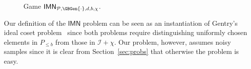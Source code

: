 \documentclass[draft]{llncs}
\newcommand{\I}{\ensuremath{\mathcal{I}}\xspace}
\newcommand{\IMN}{\ensuremath{\mathsf{IMN}}\xspace}
\newcommand{\Finalize}{\mathbf{Finalize}}
\newcommand{\Challenge}{\mathbf{Challenge}}
\newcommand{\sample}{{\;{{\leftarrow}_\$}\;}}
\newcommand{\px}{\phantom{i}}
\begin{document}
\begin{definition}
\begin{figure}[ht]
{
}
\caption{Game $\IMN_{\mathcal{P},\GBGen{\cdot},d,b,\chi}$.}
\label{fig.imn}
\vspace{-8mm} \end{figure}
\end{definition}
Our definition of the \IMN problem can be seen as an instantiation of Gentry's ideal coset problem~\cite{gentry09thesis} since both problems require distinguishing uniformly chosen elements in $P_{\leq b}$ from those in $\I + \chi$. Our problem, however, assumes noisy samples since it is clear from Section~\ref{sec:probs} that otherwise the problem is easy.
\end{document}
